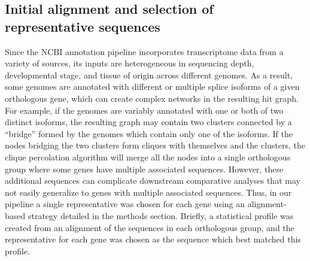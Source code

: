 \subsection*{Initial alignment and selection of representative sequences}
Since the NCBI annotation pipeline incorporates transcriptome data from a variety of sources, its inputs are heterogeneous in sequencing depth, developmental stage, and tissue of origin across different genomes. As a result, some genomes are annotated with different or multiple splice isoforms of a given orthologous gene, which can create complex networks in the resulting hit graph. For example, if the genomes are variably annotated with one or both of two distinct isoforms, the resulting graph may contain two clusters connected by a ``bridge'' formed by the genomes which contain only one of the isoforms. If the nodes bridging the two clusters form cliques with themselves and the clusters, the clique percolation algorithm will merge all the nodes into a single orthologous group where some genes have multiple associated sequences. However, these additional sequences can complicate downstream comparative analyses that may not easily generalize to genes with multiple associated sequences. Thus, in our pipeline a single representative was chosen for each gene using an alignment-based strategy detailed in the methods section. Briefly, a statistical profile was created from an alignment of the sequences in each orthologous group, and the representative for each gene was chosen as the sequence which best matched this profile.

